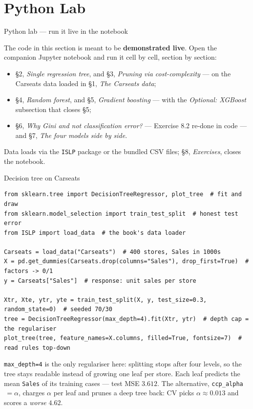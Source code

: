 \documentclass[aspectratio=169,11pt]{beamer}
\begin{document}
\section{Python Lab}

\begin{frame}{Python lab --- run it live in the notebook}
  \begin{labnote}
    The code in this section is meant to be \textbf{demonstrated live}. Open the companion Jupyter notebook and run it cell by cell, section by section:
    \begin{itemize}
      \item \S2, \emph{Single regression tree}, and \S3, \emph{Pruning via cost-complexity} --- on the Carseats data loaded in \S1, \emph{The Carseats data};
      \item \S4, \emph{Random forest}, and \S5, \emph{Gradient boosting} --- with the \emph{Optional: XGBoost} subsection that closes \S5;
      \item \S6, \emph{Why Gini and not classification error?} --- Exercise 8.2 re-done in code --- and \S7, \emph{The four models side by side}.
    \end{itemize}
    Data loads via the \texttt{ISLP} package or the bundled CSV files; \S8, \emph{Exercises}, closes the notebook.
  \end{labnote}
\end{frame}



\begin{frame}[fragile]{Decision tree on Carseats}
  \begin{lstlisting}[basicstyle=\ttfamily\scriptsize]
from sklearn.tree import DecisionTreeRegressor, plot_tree  # fit and draw
from sklearn.model_selection import train_test_split  # honest test error
from ISLP import load_data  # the book's data loader

Carseats = load_data("Carseats")  # 400 stores, Sales in 1000s
X = pd.get_dummies(Carseats.drop(columns="Sales"), drop_first=True)  # factors -> 0/1
y = Carseats["Sales"]  # response: unit sales per store

Xtr, Xte, ytr, yte = train_test_split(X, y, test_size=0.3, random_state=0)  # seeded 70/30
tree = DecisionTreeRegressor(max_depth=4).fit(Xtr, ytr)  # depth cap = the regulariser
plot_tree(tree, feature_names=X.columns, filled=True, fontsize=7)  # read rules top-down
  \end{lstlisting}
  \begin{readme}
    \texttt{max\_depth=4} is the only regulariser here: splitting stops after
    four levels, so the tree stays readable instead of growing one leaf per
    store. Each leaf predicts the mean \texttt{Sales} of its training cases
    --- test MSE $3.612$. The alternative, \texttt{ccp\_alpha}$\,=\alpha$,
    charges $\alpha$ per leaf and prunes a deep tree back: CV picks
    $\alpha\approx0.013$ and scores a \emph{worse} $4.62$.
  \end{readme}
\end{frame}
\end{document}
